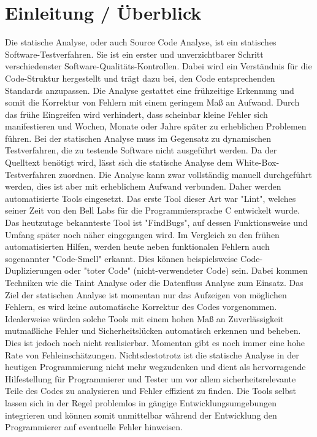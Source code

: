\section{Einleitung / \"Uberblick}
Die statische Analyse, oder auch Source Code Analyse, ist ein statisches Software-Testverfahren. Sie ist ein erster und unverzichtbarer Schritt verschiedenster Software-Qualitäts-Kontrollen. Dabei wird ein Verständnis für die Code-Struktur hergestellt und trägt dazu bei, den Code entsprechenden Standards anzupassen.
Die Analyse gestattet eine frühzeitige Erkennung und somit die Korrektur von Fehlern mit einem geringem Maß an Aufwand. Durch das frühe Eingreifen wird verhindert, dass scheinbar kleine Fehler sich manifestieren und Wochen, Monate oder Jahre später zu erheblichen Problemen führen.
Bei der statischen Analyse muss im Gegensatz zu dynamischen Testverfahren, die zu testende Software nicht ausgeführt werden. Da der Quelltext benötigt wird, lässt sich die statische Analyse dem White-Box-Testverfahren zuordnen.
Die Analyse kann zwar vollständig manuell durchgeführt werden, dies ist aber mit erheblichem Aufwand verbunden. Daher werden automatisierte Tools eingesetzt. Das erste Tool dieser Art war "Lint", welches seiner Zeit von den Bell Labs für die Programmiersprache C entwickelt wurde. Das heutzutage bekannteste Tool ist "FindBugs", auf dessen Funktionsweise und Umfang später noch näher eingegangen wird. Im Vergleich zu den frühen automatisierten Hilfen, werden heute neben funktionalen Fehlern auch sogenannter "Code-Smell" erkannt. Dies können beispielsweise Code-Duplizierungen oder "toter Code" (nicht-verwendeter Code) sein. Dabei kommen Techniken wie die Taint Analyse oder die Datenfluss Analyse zum Einsatz.
Das Ziel der statischen Analyse ist momentan nur das Aufzeigen von möglichen Fehlern, es wird keine automatische Korrektur des Codes vorgenommen. Idealerweise würden solche Tools mit einem hohen Maß an Zuverlässigkeit mutmaßliche Fehler und Sicherheitslücken automatisch erkennen und beheben. Dies ist jedoch noch nicht realisierbar. Momentan gibt es noch immer eine hohe Rate von Fehleinschätzungen.
Nichtsdestotrotz ist die statische Analyse in der heutigen Programmierung nicht mehr wegzudenken und dient als hervorragende Hilfestellung für Programmierer und Tester um vor allem sicherheitsrelevante Teile des Codes zu analysieren und Fehler effizient zu finden.
Die Tools selbst lassen sich in der Regel problemlos in gängige Entwicklungsumgebungen integrieren und können somit unmittelbar während der Entwicklung den Programmierer auf eventuelle Fehler hinweisen.
